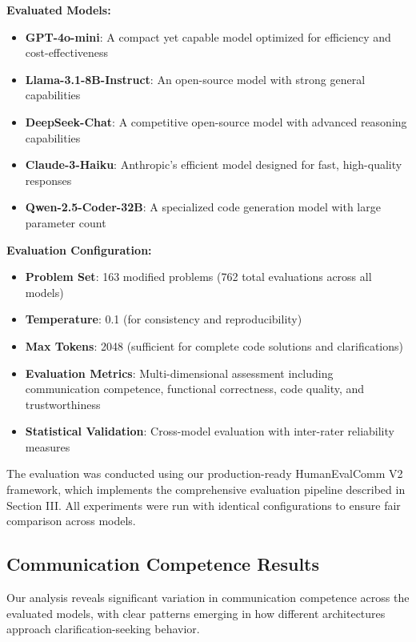 \documentclass[conference]{IEEEtran}
\begin{document}
\textbf{Evaluated Models:}

\begin{itemize}
    \item \textbf{GPT-4o-mini}: A compact yet capable model optimized for efficiency and cost-effectiveness
    \item \textbf{Llama-3.1-8B-Instruct}: An open-source model with strong general capabilities
    \item \textbf{DeepSeek-Chat}: A competitive open-source model with advanced reasoning capabilities
    \item \textbf{Claude-3-Haiku}: Anthropic's efficient model designed for fast, high-quality responses
    \item \textbf{Qwen-2.5-Coder-32B}: A specialized code generation model with large parameter count
\end{itemize}

\textbf{Evaluation Configuration:}

\begin{itemize}
    \item \textbf{Problem Set}: 163 modified problems (762 total evaluations across all models)
    \item \textbf{Temperature}: 0.1 (for consistency and reproducibility)
    \item \textbf{Max Tokens}: 2048 (sufficient for complete code solutions and clarifications)
    \item \textbf{Evaluation Metrics}: Multi-dimensional assessment including communication competence, functional correctness, code quality, and trustworthiness
    \item \textbf{Statistical Validation}: Cross-model evaluation with inter-rater reliability measures
\end{itemize}

The evaluation was conducted using our production-ready HumanEvalComm V2 framework, which implements the comprehensive evaluation pipeline described in Section III. All experiments were run with identical configurations to ensure fair comparison across models.

\subsection{Communication Competence Results}

Our analysis reveals significant variation in communication competence across the evaluated models, with clear patterns emerging in how different architectures approach clarification-seeking behavior.
\end{document}
